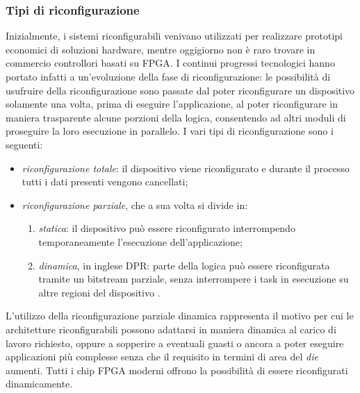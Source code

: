 \subsubsection{Tipi di riconfigurazione}
Inizialmente, i sistemi riconfigurabili venivano utilizzati per realizzare prototipi
economici di soluzioni hardware, mentre oggigiorno non \`e raro trovare in commercio
controllori basati su \ac{FPGA}. I continui progressi tecnologici hanno portato infatti
a un'evoluzione della fase di riconfigurazione: le possibilit\`a di usufruire della
riconfigurazione sono passate dal poter riconfigurare un dispositivo solamente una volta,
prima di eseguire l'applicazione, al poter riconfigurare in maniera trasparente alcune porzioni
della logica, consentendo ad altri moduli di proseguire la loro esecuzione in parallelo.
I vari tipi di riconfigurazione sono i seguenti:
\begin{itemize}
 \item \emph{riconfigurazione totale}: il dispositivo viene riconfigurato e durante
   il processo tutti i dati presenti vengono cancellati;
 \item \emph{riconfigurazione parziale}, che a sua volta si divide in:
     \begin{enumerate}
        \item \emph{statica}: il dispositivo può essere riconfigurato
interrompendo temporaneamente l'esecuzione dell'applicazione;
        \item \emph{dinamica}, in inglese \acf{DPR}: parte della logica
può essere riconfigurata tramite un bitstream parziale, senza interrompere i task in
esecuzione su altre regioni del dispositivo \cite{DPRInFPGA}.
    \end{enumerate}
\end{itemize}
L'utilizzo della riconfigurazione parziale dinamica rappresenta il motivo per cui le
architetture riconfigurabili possono adattarsi in maniera dinamica al carico di lavoro richiesto,
oppure a sopperire a eventuali guasti o ancora a poter eseguire applicazioni pi\`u complesse
senza che il requisito in termini di area del \emph{die} aumenti. Tutti i chip \ac{FPGA} moderni
offrono la possibilit\`a di essere riconfigurati dinamicamente.

